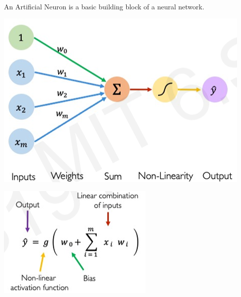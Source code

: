 \documentclass[letterpaper, 10.5pt,landscape]{article}
\begin{document}
\begin{multicols*}{3}
An Artificial Neuron is a basic building block of a neural network.
\vspace{-5pt}
\begin{center}
    \begin{minipage}{0.6\linewidth}
    \includegraphics[width=\textwidth]{figures/perceptron_artificial_neuron.png}
    \end{minipage}
\end{center}


\vspace{-5pt}
\begin{center}
    \begin{minipage}{0.5\linewidth}
    \includegraphics[width=\textwidth]{figures/perceptron_artificial_neuron_equation.png}
    \end{minipage}
\end{center}
\vspace{-5pt}





\end{multicols*}
\end{document}
